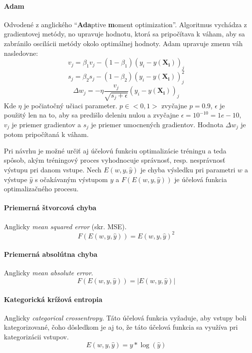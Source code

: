 \paragraph{Adam}
Odvodené z anglického \enquote{\textbf{Ada}ptive \textbf{m}oment optimization}.
Algoritmus vychádza z gradientovej metódy, no upravuje hodnotu, ktorá sa pripočítava k váham, aby sa zabránilo oscilácii
metódy okolo optimálnej hodnoty.
Adam upravuje zmenu váh nasledovne:
\begin{equation}
    v_j=\beta_1{v_j}-(1-\beta_1)(y_i-y(\mathbf{X_i}))_j
\end{equation}
\begin{equation}
    s_j=\beta_2{s_j}-(1-\beta_2)(y_i-y(\mathbf{X_i}))_j^2
\end{equation}
\begin{equation}
    \Delta{w_j}=-\eta\frac{v_j}{\sqrt{s_j+\epsilon}}(y_i-y(\mathbf{X_i}))_j
\end{equation}
Kde $\eta$ je počiatočný učiaci parameter.
$p \in <0,1>$ zvyčajne $p=0.9$, $\epsilon$ je použitý len na to, aby sa predišlo deleniu nulou a zvyčajne
$\epsilon = 10^{-10} = 1e-10$, $v_j$ je priemer gradientov a $s_j$ je priemer umocnených gradientov.
Hodnota $\Delta{w_j}$ je potom pripočítaná k váham.

Pri návrhu je možné určiť aj účelovú funkciu optimalizácie tréningu a teda spôsob, akým tréningový proces vyhodnocuje
správnosť, resp. nesprávnosť výstupu pri danom vstupe.
Nech $E(w, y, \hat{y})$ je chyba výsledku pri parametri $w$ a výstupe $\hat{y}$ s očakávaným výstupom $y$
a $F(E(w, y, \hat{y}))$ je účelová funkcia optimalizačného procesu.
\paragraph{Priemerná štvorcová chyba}
Anglicky \emph{mean squared error} (skr. MSE).
\begin{equation}
    F(E(w, y, \hat{y}))=E(w, y, \hat{y})^2
\end{equation}
\paragraph{Priemerná absolútna chyba}
Anglicky \emph{mean absolute error}.
\begin{equation}
    F(E(w, y, \hat{y}))=|E(w, y, \hat{y})|
\end{equation}
\paragraph{Kategorická krížová entropia}
Anglicky \emph{categorical crossentropy}.
Táto účelová funkcia vyžaduje, aby vstupy boli kategorizované, čoho dôsledkom je aj to, že táto účelová funkcia sa
využíva pri kategorizácii vstupov.
\begin{equation}
    E(w, y, \hat{y})=y*\log(\hat{y})
\end{equation}

